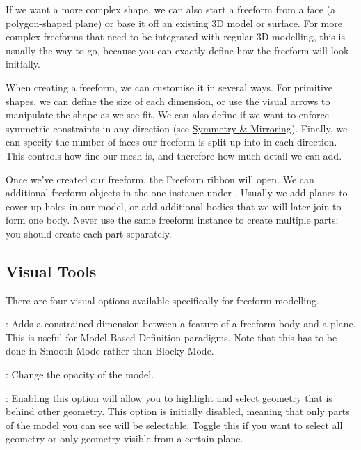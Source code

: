 If we want a more complex shape, we can also start a freeform from a face (a polygon-shaped plane) or base it off an existing 3D model or surface. For more complex freeforms that need to be integrated with regular 3D modelling, this is usually the way to go, because you can exactly define how the freeform will look initially. 

When creating a freeform, we can customise it in several ways. For primitive shapes, we can define the size of each dimension, or use the visual arrows to manipulate the shape as we see fit. We can also define if we want to enforce symmetric constraints in any direction (see \hyperref[subsection:freeform-symmetry]{Symmetry \& Mirroring}). Finally, we can specify the number of faces our freeform is split up into in each direction. This controls how fine our mesh is, and therefore how much detail we can add.

Once we've created our freeform, the Freeform ribbon will open. We can additional freeform objects in the one instance under . Usually we add planes to cover up holes in our model, or add additional bodies that we will later join to form one body. Never use the same freeform instance to create multiple parts; you should create each part separately.

\subsection{Visual Tools}

There are four visual options available specifically for freeform modelling.

: \newline
Adds a constrained dimension between a feature of a freeform body and a plane. This is useful for Model-Based Definition paradigms. Note that this has to be done in Smooth Mode rather than Blocky Mode.

: \newline
Change the opacity of the model. 

: \newline
Enabling this option will allow you to highlight and select geometry that is behind other geometry. This option is initially disabled, meaning that only parts of the model you can see will be selectable. Toggle this if you want to select all geometry or only geometry visible from a certain plane.

